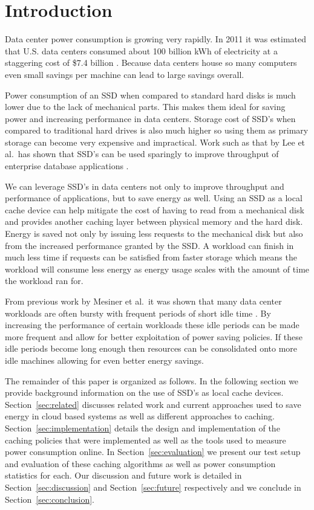\section{Introduction}

Data center power consumption is growing very rapidly. In 2011 it was estimated
that U.S. data centers consumed about 100 billion kWh of electricity at a
staggering cost of \$7.4 billion \cite{data-center-power}. Because data centers
house so many computers even small savings per machine can lead to large
savings overall.

Power consumption of an SSD when compared to standard hard disks is much lower
due to the lack of mechanical parts. This makes them ideal for saving power and
increasing performance in data centers. Storage cost of SSD's when compared to
traditional hard drives is also much higher so using them as primary storage can
become very expensive and impractical. Work such as that by Lee et al.\ has
shown that SSD's can be used sparingly to improve throughput of enterprise
database applications \cite{enterprise-ssd}.

We can leverage SSD's in data centers not only to improve throughput and
performance of applications, but to save energy as well. Using an SSD as a local
cache device can help mitigate the cost of having to read from a mechanical disk
and provides another caching layer between physical memory and the hard
disk. Energy is saved not only by issuing less requests to the mechanical disk
but also from the increased performance granted by the SSD. A workload can
finish in much less time if requests can be satisfied from faster storage which
means the workload will consume less energy as energy usage scales with the
amount of time the workload ran for.

From previous work by Mesiner et al.\ it was shown that many data center
workloads are often bursty with frequent periods of short idle time
\cite{powernap}. By increasing the performance of certain workloads these idle
periods can be made more frequent and allow for better exploitation of power
saving policies. If these idle periods become long enough then resources can be
consolidated onto more idle machines allowing for even better energy savings.

The remainder of this paper is organized as follows. In the following section we
provide background information on the use of SSD's as local cache
devices. Section~\ref{sec:related} discusses related work and current approaches
used to save energy in cloud based systems as well as different approaches to
caching. Section~\ref{sec:implementation} details the design and implementation
of the caching policies that were implemented as well as the tools used to
measure power consumption online. In Section~\ref{sec:evaluation} we present our
test setup and evaluation of these caching algorithms as well as power
consumption statistics for each. Our discussion and future work is detailed in
Section~\ref{sec:discussion} and Section~\ref{sec:future} respectively and we
conclude in Section~\ref{sec:conclusion}.
